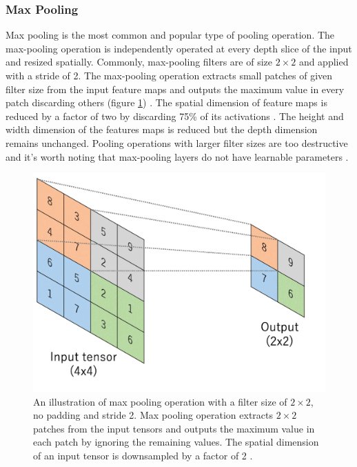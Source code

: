 \subsubsection{Max Pooling}
Max pooling is the most common and popular type of pooling operation. The max-pooling operation is independently operated at every depth slice of the input and resized spatially. Commonly, max-pooling filters are of size $2 \times 2$ and applied with a stride of 2. The max-pooling operation extracts small patches of given filter size from the input feature maps and outputs the maximum value in every patch discarding others (figure \ref{fig:PoolingLayer}) \cite{goodfellow2017deep}. The spatial dimension of feature maps is reduced by a factor of two by discarding 75\% of its activations \cite{kumar2018ordinal}. The height and width dimension of the features maps is reduced but the depth dimension remains unchanged. Pooling operations with larger filter sizes are too destructive and it's worth noting that max-pooling layers do not have learnable parameters \cite{articleCNNs}.


\begin{figure}[H]
        \begin{center}
	    \includegraphics[scale=0.50]{images/Fundamentals/PoolingLayer.png}
	    \caption[An illustration of Max Pooling Operation.]{An illustration of max pooling operation with a filter size of $2 \times 2$, no padding and stride 2. Max pooling operation extracts $2 \times 2$ patches from the input tensors and outputs the maximum value in each patch by ignoring the remaining values. The spatial dimension of an input tensor is downsampled by a factor of 2 \cite{articleCNNs}.}
	    \label{fig:PoolingLayer}
	    \end{center}
\end{figure}


